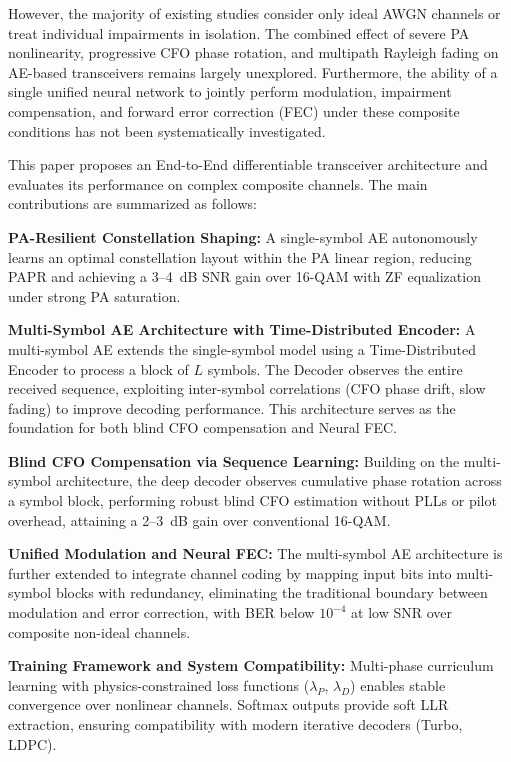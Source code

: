 \documentclass{JECnew}
\begin{document}
{\color{blue}However, the majority of existing studies consider only ideal AWGN channels or treat individual impairments in isolation. The combined effect of severe PA nonlinearity, progressive CFO phase rotation, and multipath Rayleigh fading on AE-based transceivers remains largely unexplored. Furthermore, the ability of a single unified neural network to jointly perform modulation, impairment compensation, and forward error correction (FEC) under these composite conditions has not been systematically investigated.}

{\color{blue}This paper proposes an End-to-End differentiable transceiver architecture and evaluates its performance on complex composite channels. The main contributions are summarized as follows:}
\begin{itemize}
    {\color{blue}\item \textbf{PA-Resilient Constellation Shaping:} A single-symbol AE autonomously learns an optimal constellation layout within the PA linear region, reducing PAPR and achieving a 3--4~dB SNR gain over 16-QAM with ZF equalization under strong PA saturation.}
    {\color{blue}\item \textbf{Multi-Symbol AE Architecture with Time-Distributed Encoder:} A multi-symbol AE extends the single-symbol model using a Time-Distributed Encoder to process a block of $L$ symbols. The Decoder observes the entire received sequence, exploiting inter-symbol correlations (CFO phase drift, slow fading) to improve decoding performance. This architecture serves as the foundation for both blind CFO compensation and Neural FEC.}
    {\color{blue}\item \textbf{Blind CFO Compensation via Sequence Learning:} Building on the multi-symbol architecture, the deep decoder observes cumulative phase rotation across a symbol block, performing robust blind CFO estimation without PLLs or pilot overhead, attaining a 2--3~dB gain over conventional 16-QAM.}
    {\color{blue}\item \textbf{Unified Modulation and Neural FEC:} The multi-symbol AE architecture is further extended to integrate channel coding by mapping input bits into multi-symbol blocks with redundancy, eliminating the traditional boundary between modulation and error correction, with BER below $10^{-4}$ at low SNR over composite non-ideal channels.}
    {\color{blue}\item \textbf{Training Framework and System Compatibility:} Multi-phase curriculum learning with physics-constrained loss functions ($\lambda_P$, $\lambda_D$) enables stable convergence over nonlinear channels. Softmax outputs provide soft LLR extraction, ensuring compatibility with modern iterative decoders (Turbo, LDPC).}
\end{itemize}
\end{document}
